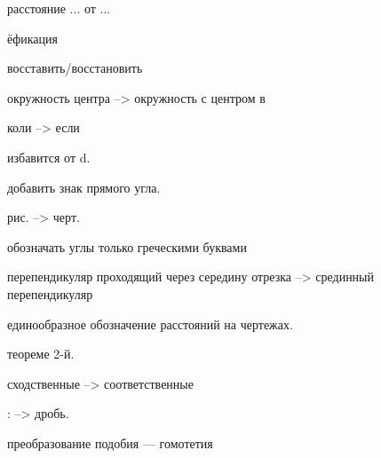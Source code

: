 расстояние ... от ...

ёфикация

восставить/восстановить

окружность центра --> окружность с центром в

коли --> если

избавится от d.

добавить знак прямого угла.

рис. --> черт.

обозначать углы только греческими буквами

перепендикуляр проходящий через середину отрезка --> срединный перепендикуляр

единообразное обозначение расстояний на чертежах.

теореме 2-й.

сходственные --> соответственные

: --> дробь.

преобразование подобия --- гомотетия